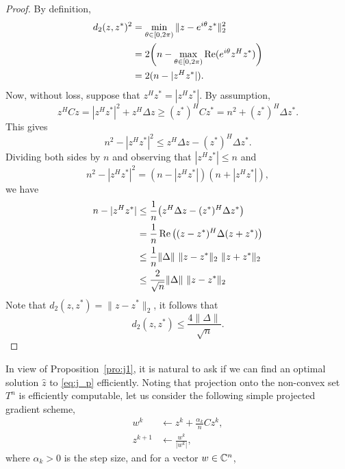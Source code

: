 \begin{proof}
By definition,
\begin{equation}
\begin{split}
    d_2(z,z^*)^2 &=\min_{\theta\in[0,2\pi)}\|z-e^{i\theta}z^*\|_2^2 \\
        &= 2\bigg(n-\max_{\theta\in[0,2\pi)}\mathop{\mathrm{Re}}(e^{i\theta}z^Hz^*)\bigg) \\
        &= 2(n-|z^Hz^*|).
\end{split}
\end{equation}
Now,
without loss,
suppose that $z^Hz^*=|z^Hz^*|$.
By assumption,
\begin{equation}
    z^HCz=|z^Hz^*|^2+z^H\Delta z\ge(z^*)^HCz^*=n^2+(z^*)^H\Delta z^*.
\end{equation}
This gives
\begin{equation}
    n^2-|z^Hz^*|^2\le z^H\Delta z-(z^*)^H\Delta z^*.
\end{equation}
Dividing both sides by $n$ and observing that $|z^Hz^*|\le n$ and
\begin{equation}
    n^2-|z^Hz^*|^2=(n-|z^Hz^*|)(n+|z^Hz^*|),
\end{equation}
we have
\begin{equation}
\begin{split}
    n-|z^Hz^*|
        &\le \frac{1}{n}\big(z^H\Delta z-(z^*)^H\Delta z^*\big) \\
        &= \frac{1}{n}\mathop{\mathrm{Re}}\big((z-z^*)^H\Delta (z+z^*)\big) \\
        &\le \frac{1}{n}\|\Delta\|~\|z-z^*\|_2~\|z+z^*\|_2 \\
        &\le \frac{2}{\sqrt{n}}\|\Delta\|~\|z-z^*\|_2
\end{split}
\end{equation}
Note that $d_2(z,z^*)=\|z-z^*\|_2$,
it follows that
\begin{equation}
    d_2(z,z^*)\le \frac{4\|\Delta\|}{\sqrt{n}}.
\end{equation}
\end{proof}

In view of Proposition~\ref{pro:j1},
it is natural to ask if we can find an optimal solution $\hat z$
to \eqref{eq:j_p} efficiently.
Noting that projection onto the non-convex set $T^n$ is efficiently computable,
let us consider the following simple projected gradient scheme,
\begin{equation}
\begin{split}
    w^k &\leftarrow z^k + \frac{\alpha_k}{n}Cz^k, \\
    z^{k+1}&\leftarrow \frac{w^k}{|w^k|},
\end{split}
\end{equation}
where $\alpha_k>0$ is the step size,
and for a vector $w\in{\mathbb{C}}^n$,
\todo

